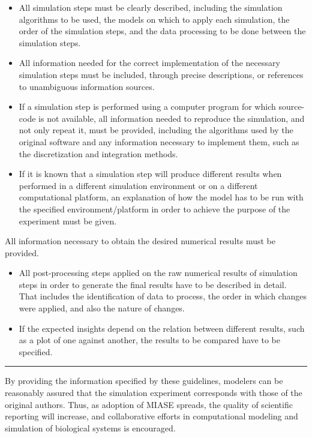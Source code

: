 \documentclass[]{article}
\begin{document}
\begin{itemize}
\item
  All simulation steps must be clearly described, including the
  simulation algorithms to be used, the models on which to apply each
  simulation, the order of the simulation steps, and the data processing
  to be done between the simulation steps.
\item
  All information needed for the correct implementation of the necessary
  simulation steps must be included, through precise descriptions, or
  references to unambiguous information sources.
\item
  If a simulation step is performed using a computer program for which
  source-code is not available, all information needed to reproduce the
  simulation, and not only repeat it, must be provided, including the
  algorithms used by the original software and any information necessary
  to implement them, such as the discretization and integration methods.
\item
  If it is known that a simulation step will produce different results
  when performed in a different simulation environment or on a different
  computational platform, an explanation of how the model has to be run
  with the specified environment/platform in order to achieve the
  purpose of the experiment must be given.
\end{itemize}
All information necessary to obtain the desired numerical results must
be provided.

\begin{itemize}
\item
  All post-processing steps applied on the raw numerical results of
  simulation steps in order to generate the final results have to be
  described in detail. That includes the identification of data to
  process, the order in which changes were applied, and also the nature
  of changes.
\item
  If the expected insights depend on the relation between different
  results, such as a plot of one against another, the results to be
  compared have to be specified.
\end{itemize}
\begin{center}\rule{3in}{0.4pt}\end{center}

By providing the information specified by these guidelines, modelers can
be reasonably assured that the simulation experiment corresponds with
those of the original authors. Thus, as adoption of MIASE spreads, the
quality of scientific reporting will increase, and collaborative efforts
in computational modeling and simulation of biological systems is
encouraged.
\end{document}
